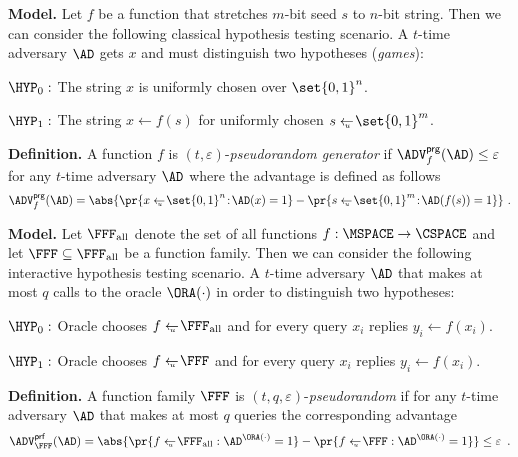 \documentclass[landscape,footrule]{foils}
\begin{document}


\textbf{Model.}
Let $f$ be a function that stretches $m$-bit seed $s$ to $n$-bit
string. Then we can consider the following classical hypothesis testing
scenario. A $t$-time adversary $\AD$ gets $x$ and must distinguish two
hypotheses (\emph{games}):
\begin{triangles}
\item $\HYP_0:$ The string $x$ is uniformly chosen over $\set{0,1}^n$.
\item $\HYP_1:$ The string $x\gets f(s)$ for uniformly chosen $s\getsu\set{0,1}^m$. 
\end{triangles}
\Bigskip

\textbf{Definition.}
A function $f$ is $(t,\varepsilon)$-\emph{pseudorandom generator} if
$\advPRGXX{f}{\AD}\leq\varepsilon$ for any $t$-time adversary $\AD$
where the  advantage is defined as follows
\begin{align*}
  \advPRGXX{f}{\AD}%
  =\abs{\pr{\smash{x\getsu\set{0,1}^n\!:\!\AD(x)=1}}
  -\pr{\smash{s\getsu\set{0,1}^m\!:\!\AD(f(s))=1}}}\!\enspace.
\end{align*}



\textbf{Model.}
Let $\FFFALL$ denote the set of all functions $f:\MSPACE\to\CSPACE$
and let $\FFF\subseteq \FFFALL$ be a function family. Then we can
consider the following interactive hypothesis testing scenario. A
$t$-time adversary $\AD$ that makes at most $q$ calls to the oracle
$\ORA(\cdot)$ in order to distinguish two hypotheses:
\begin{triangles}
\item $\HYP_0:$ Oracle chooses $f\getsu\FFFALL$ and for every query
  $x_i$ replies $y_i\gets f(x_i)$.
\item $\HYP_1:$ Oracle chooses $f\getsu \FFF$ and for every query
  $x_i$ replies $y_i\gets f(x_i)$.
\end{triangles}
\Bigskip

\textbf{Definition.}  A function family $\FFF$ is
$(t,q,\varepsilon)$-\emph{pseudorandom} if for any $t$-time adversary
$\AD$ that makes at most $q$ queries the corresponding advantage
\begin{align*}
  \advPRFXX{\FFF}{\AD}%
  =\abs{\pr{\smash{f\getsu\FFFALL:\AD^{\ORA(\cdot)}=1}}-\pr{\smash{f\getsu\FFF:\AD^{\ORA(\cdot)}=1}}}
  \leq\varepsilon\enspace.
\end{align*}
\end{document}

